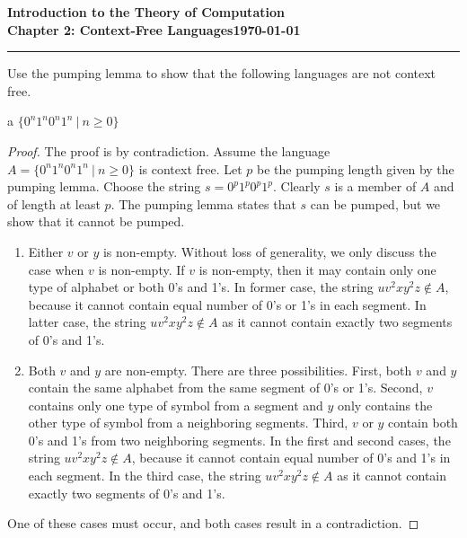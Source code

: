 \documentclass[11pt]{article}
\newcommand{\dated}{\today}
\begin{document}
\textbf{Introduction to the Theory of
Computation}\hfill\textbf{\myname}\\[0.01in]
\textbf{Chapter 2: Context-Free Languages}\hfill\textbf{\dated}\\
\smallskip\hrule\bigskip

\begin{problem}{2.30}
Use the pumping lemma to show that the following languages are not context free.
\end{problem}

\begin{problem}[Part]{a}
$\{0^{n}1^{n}0^{n}1^{n} \ | \ n \geq 0\}$
\end{problem}

\begin{proof}
The proof is by contradiction. Assume the language $A = \{0^{n}1^{n}0^{n}1^{n} \ | \ n \geq 0\}$ is context free. Let $p$ be the pumping length given by the pumping lemma. Choose the string $s = 0^{p}1^{p}0^{p}1^{p}$. Clearly $s$ is a member of $A$ and of length at least $p$. The pumping lemma states that $s$ can be pumped, but we show that it cannot be pumped.

\begin{enumerate}
\item Either $v$ or $y$ is non-empty. Without loss of generality, we only discuss the case when $v$ is non-empty. If $v$ is non-empty, then it may contain only one type of alphabet or both 0's and 1's. In former case, the string $uv^{2}xy^{2}z \notin A$, because it cannot contain equal number of 0's or 1's in each segment. In latter case, the string $uv^{2}xy^{2}z \notin A$ as it cannot contain exactly two segments of 0's and 1's.
\item Both $v$ and $y$ are non-empty. There are three possibilities. First, both $v$ and $y$ contain the same alphabet from the same segment of 0's or 1's. Second, $v$ contains only one type of symbol from a segment and $y$ only contains the other type of symbol from a neighboring segments. Third, $v$ or $y$ contain both 0's and 1's from two neighboring segments. In the first and second cases, the string $uv^{2}xy^{2}z \notin A$, because it cannot contain equal number of 0's and 1's in each segment. In the third case, the string $uv^{2}xy^{2}z \notin A$ as it cannot contain exactly two segments of 0's and 1's.
\end{enumerate}
One of these cases must occur, and both cases result in a contradiction.
\end{proof}
\end{document}
